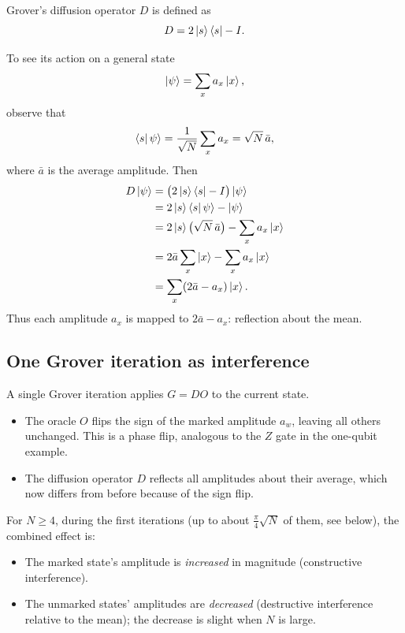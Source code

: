\documentclass[a4paper,11pt]{article}
\providecommand{\ket}[1]{\mathinner{|{#1}\rangle}}
\providecommand{\bra}[1]{\mathinner{\langle{#1}|}}
\providecommand{\braket}[2]{\mathinner{\langle{#1}|\,{#2}\rangle}}
\begin{document}
Grover's diffusion operator $D$ is defined as
\begin{equation}
  D = 2\ket{s}\bra{s} - I.
\end{equation}

To see its action on a general state
\[
  \ket{\psi} = \sum_{x} a_x\ket{x},
\]
observe that
\[
  \braket{s}{\psi} = \frac{1}{\sqrt{N}}\sum_{x} a_x = \sqrt{N}\,\bar{a},
\]
where $\bar{a}$ is the average amplitude. Then
\begin{align}
  D\ket{\psi} &= \bigl(2\ket{s}\bra{s} - I\bigr)\ket{\psi} \\
  &= 2\ket{s}\braket{s}{\psi} - \ket{\psi} \\
  &= 2\ket{s}\bigl(\sqrt{N}\,\bar{a}\bigr) - \sum_{x} a_x\ket{x} \\
  &= 2\bar{a}\sum_{x}\ket{x} - \sum_{x} a_x\ket{x} \\
  &= \sum_{x}(2\bar{a} - a_x)\ket{x}.
\end{align}
Thus each amplitude $a_x$ is mapped to $2\bar{a} - a_x$: reflection about the mean.

\subsection*{One Grover iteration as interference}

A single Grover iteration applies $G = DO$ to the current state.

\begin{itemize}
  \item The oracle $O$ flips the sign of the marked amplitude $a_w$, leaving all others
    unchanged. This is a phase flip, analogous to the $Z$ gate in the one-qubit example.
  \item The diffusion operator $D$ reflects all amplitudes about their average, which now
    differs from before because of the sign flip.
\end{itemize}

For $N \geq 4$, during the first iterations (up to about $\frac{\pi}{4}\sqrt{N}$ of them, see below), the
combined effect is:
\begin{itemize}
  \item The marked state's amplitude is \emph{increased} in magnitude (constructive
    interference).
  \item The unmarked states' amplitudes are \emph{decreased} (destructive interference relative to
    the mean); the decrease is slight when $N$ is large.
\end{itemize}
\end{document}
